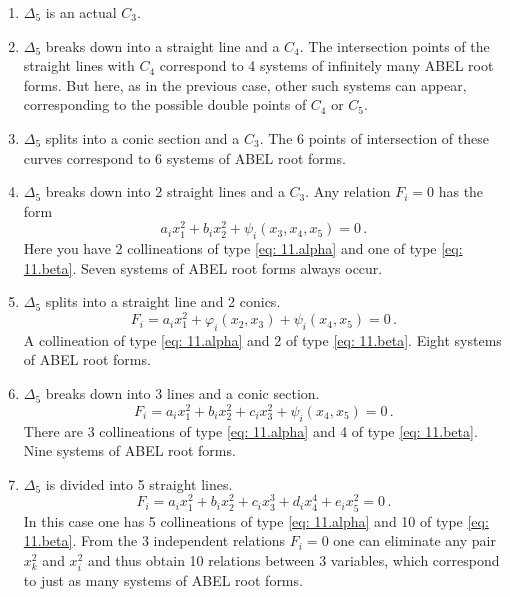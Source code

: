 \documentclass[leqno]{article}
\begin{document}
\begin{enumerate}[label=\arabic*)]
	\item $\Delta_5$ is an actual $C_3$.
	\item $\Delta_5$ breaks down into a straight line and a $C_4$. The intersection points of the straight lines with $C_4$ correspond to 4 systems of infinitely many ABEL root forms. But here, as in the previous case, other such systems can appear, corresponding to the possible double points of $C_4$ or $C_5$.
	\item $\Delta_5$ splits into a conic section and a $C_3$. The 6 points of intersection of these curves correspond to 6 systems of ABEL root forms.
	\item $\Delta_5$ breaks down into 2 straight lines and a $C_3$. Any relation $F_i=0$ has the form
	\begin{equation}\label{eq: 11.c}
	a_i x_1^2 + b_i x_2^2 + \psi_i(x_3, x_4, x_5) = 0 \, . \tag{c}
	\end{equation}
	Here you have 2 collineations of type \eqref{eq: 11.alpha} and one of type \eqref{eq: 11.beta}. Seven systems of ABEL root forms always occur.
	\item $\Delta_5$ splits into a straight line and 2 conics.
	\begin{equation}\label{eq: 11.d}
	    F_i = a_i x_1^2 + \varphi_i(x_2, x_3) + \psi_i(x_4, x_5) = 0 \, . \tag{d}
	\end{equation}
	A collineation of type \eqref{eq: 11.alpha} and 2 of type \eqref{eq: 11.beta}. Eight systems of ABEL root forms.
	\item $\Delta_5$ breaks down into 3 lines and a conic section.
	\begin{equation}\label{eq: 11.e}
	    F_i = a_i x_1^2 + b_i x_2^2 + c_i x_3^2 + \psi_i(x_4, x_5) = 0 \, . \tag{e}
	\end{equation}
	There are 3 collineations of type \eqref{eq: 11.alpha} and 4 of type \eqref{eq: 11.beta}. Nine systems of ABEL root forms.
	\item $\Delta_5$ is divided into 5 straight lines. 
	\begin{equation}\label{eq: 11.f}
	F_i = a_i x_1^2 + b_i x_2^2 + c_i x_3^3 + d_i x_4^4 + e_i x_5^2 = 0 \, . \tag{f}
	\end{equation}
	In this case one has 5 collineations of type \eqref{eq: 11.alpha} and 10 of type \eqref{eq: 11.beta}. From the 3 independent relations $F_i=0$ one can eliminate any pair $x_k^2$ and $x_i^2$ and thus obtain 10 relations between 3 variables, which correspond to just as many systems of ABEL root forms.
\end{enumerate}
\end{document}
